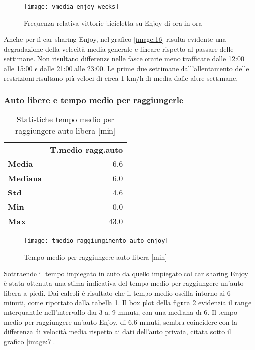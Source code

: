 \begin{figure}[H]
	\texttt{[image: vmedia\_enjoy\_weeks]}
	\caption{Frequenza relativa vittorie bicicletta su Enjoy di ora in ora}
	\label{image:28}
\end{figure}

Anche per il car sharing Enjoy, nel grafico \ref{image:16} risulta evidente una degradazione della velocità media generale e lineare rispetto al passare delle settimane. Non risultano differenze nelle fasce orarie meno trafficate dalle 12:00 alle 15:00 e dalle 21:00 alle 23:00. Le prime due settimane dall'allentamento delle restrizioni risultano più veloci di circa 1 km/h di media dalle altre settimane.

\subsubsection{Auto libere e tempo medio per raggiungerle}

\begin{table}[H]
\centering
\begin{tabular}{ | l r | }
\hline
& \textbf{T.medio ragg.auto} \\
\textbf{Media}   &  6.6 \\
\textbf{Mediana} &  6.0 \\
\textbf{Std}     &  4.6 \\
\textbf{Min}     &  0.0 \\ 
\textbf{Max}     & 43.0 \\
\hline
\end{tabular}
\caption{Statistiche tempo medio per raggiungere auto libera [min]}
\label{table:4}
\end{table}

\begin{figure}[H]
	\texttt{[image: tmedio\_raggiungimento\_auto\_enjoy]}
	\caption{Tempo medio per raggiungere auto libera [min]}
	\label{image:8}
\end{figure}

Sottraendo il tempo impiegato in auto da quello impiegato col car sharing Enjoy è stata ottenuta una stima indicativa del tempo medio per raggiungere un'auto libera a piedi. Dai calcoli è risultato che il tempo medio oscilla intorno ai 6 minuti, come riportato dalla tabella \ref{table:4}. Il box plot della figura \ref{image:8} evidenzia il range interquantile nell'intervallo dai 3 ai 9 minuti, con una mediana di 6. Il tempo medio per raggiungere un'auto Enjoy, di 6.6 minuti, sembra coincidere con la differenza di velocità media rispetto ai dati dell'auto privata, citata sotto il grafico \ref{image:7}.

